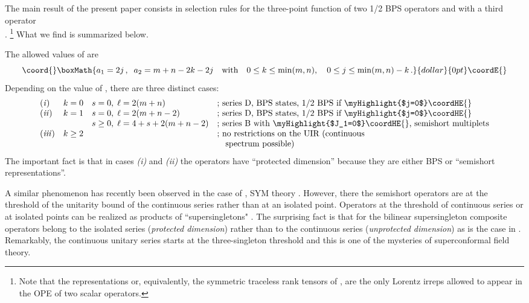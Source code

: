\documentclass[a4paper,11pt]{article}
\begin{document}
The main result of the present paper consists in selection rules
for the three-point function of two 1/2 BPS operators \coordHE{} and \coordHE{} with a third
operator\\ \coordHE{}. \footnote{Note that the
\coordHE{} representations \myHighlight{$[0,s,0]$}\coordHE{} or, equivalently, the
symmetric traceless rank \coordHE{} tensors of \coordHE{}, are the
only Lorentz irreps allowed to appear in the OPE of two scalar
operators.} What we find is summarized below.

The allowed values of \coordHE{} are
$$\coord{}\boxMath{
a_1=2j\,,\; \; a_2=m+n-2k-2j \quad\mbox{with}\quad 0 \leq k \leq
\min(m,n), \quad 0 \leq j \leq \min(m,n)-k     \,.
}{dollar}{0pt}\coordE{}$$
Depending on the value of \coordHE{}, there are three distinct cases:
$$
  \begin{array}{llll}
   {\it (i)} & k=0 & s=0, \; \ell=2(m+n) &
             \mbox{;\ series D, BPS states, 1/2 BPS if \myHighlight{$j=0$}\coordHE{}} \\
    {\it (ii)} & k=1 & s=0, \; \ell=2(m+n-2) & \mbox{;\ series D, BPS states, 1/2 BPS if
\myHighlight{$j=0$}\coordHE{}} \\
     &  & s \geq 0, \; \ell = 4 + s +
2(m+n-2) & \mbox{;\ series B with \myHighlight{$J_1=0$}\coordHE{}, semishort multiplets} \\
   {\it (iii)} & k \geq 2 & &\mbox{;\ no restrictions on the UIR  (continuous } \\
   & & & \mbox{\quad spectrum possible)}
  \end{array}
$$
The important fact is that in cases {\it (i)} and {\it (ii)} the operators
have ``protected dimension'' because they are either BPS or
``semishort representations''.

A similar phenomenon has recently been observed in the case of
\coordHE{}, \coordHE{} SYM theory \cite{ES}. However, there the semishort
operators are at the threshold of the unitarity bound of the
continuous series rather than at an isolated point. Operators at
the threshold of continuous series or at isolated points can be
realized as products of ``supersingletons" \cite{FS1}. The
surprising fact is that for \coordHE{} the  bilinear supersingleton
composite operators belong to the isolated series ({\it protected
dimension}) rather than to the continuous series ({\it unprotected
dimension}) as is the case in \coordHE{}. Remarkably, the continuous
unitary series starts at the three-singleton threshold and this is
one of the mysteries of \coordHE{} superconformal field theory.
\end{document}
